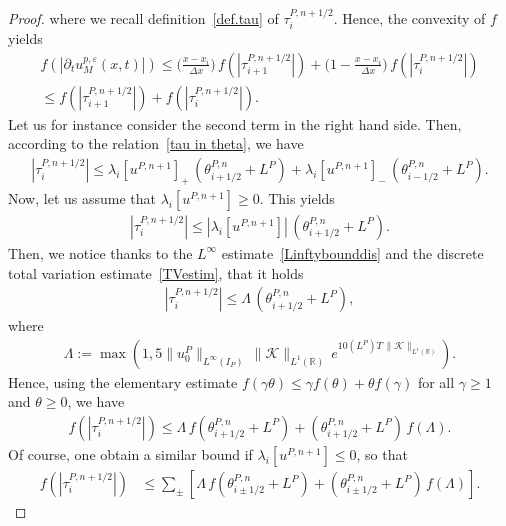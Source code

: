 \documentclass[10pt,a4paper]{amsart}
\newcommand{\K}{\mathcal{K}}
\newcommand{\R}{\mathbb{R}}
\newcommand{\eps}{\varepsilon}
\begin{document}
\begin{proof}
where we recall definition~\eqref{def.tau} of $\tau^{P,n+1/2}_i$. Hence, the convexity of $f$ yields
\begin{multline*}
    f\left(\left|\partial_t u^{p, \eps}_M(x,t)\right|\right) \leq \bigg(\frac{x - x_i}{\Delta x}\bigg)\,f\left(\left|\tau_{i + 1}^{P, n + 1/2}\right|\right) + \bigg( 1 - \frac{x - x_i}{\Delta x}\bigg) \, f\left(\left|\tau_{i } ^{P, n +1/2}\right|\right)\\
    \leq f\left(\left|\tau_{i + 1}^{P, n + 1/2}\right|\right) +  f\left(\left|\tau_{i } ^{P, n +1/2}\right|\right).
\end{multline*}
Let us for instance consider the second term in the right hand side. Then, according to the relation~\eqref{tau in theta}, we have
\begin{align*}
    \left|\tau_i^{P, n +1/2}\right| \leq \lambda_i[u^{P, n + 1}]_+ \, \left(\theta_{i +1/2}^{P,n} + L^P\right) + \lambda_i[u^{P,n + 1}]_- \, \left(\theta_{i-1/2}^{P, n} + L^P\right).
\end{align*}
Now, let us assume that $\lambda_i[u^{P,n+1}]\ge 0$. This yields
\begin{align*}
    \left|\tau_i^{P, n +1/2}\right| \leq |\lambda_i[u^{P, n + 1}]| \, \left(\theta_{i +1/2}^{P,n} + L^P\right).
\end{align*}
Then, we notice thanks to the $L^\infty$ estimate~\eqref{Linftybounddis} and the discrete total variation estimate~\eqref{TVestim}, that it holds
\begin{align*}
    \left|\tau_i^{P, n +1/2}\right| \leq \Lambda\, \left(\theta_{i +1/2}^{P,n} + L^P\right),
\end{align*}
where
\begin{align*}
    \Lambda := \max\left(1,5\|u^P_0\|_{L^\infty(I_P)} \, \|\K\|_{L^1(\R)} \, e^{10 (L^P)T \, \|\K\|_{L^1(\R)}}\right).
\end{align*}
Hence, using the elementary estimate $f(\gamma \theta) \leq \gamma f(\theta)+\theta f(\gamma)$ for all $\gamma\geq 1$ and $\theta \geq 0$, we have
\begin{align*}
    f\left(\left|\tau_i^{P, n +1/2}\right|\right) \leq \Lambda\, f\left(\theta_{i +1/2}^{P,n} + L^P\right) + \left(\theta_{i +1/2}^{P,n} + L^P\right)  \, f\left(\Lambda\right).
\end{align*}
Of course, one obtain a similar bound if $\lambda_i[u^{P,n+1}]\le 0$, so that
\begin{align}\label{bound.ftau}
    f\left(\left|\tau_i^{P, n +1/2}\right|\right) &\leq \sum_{\pm} \left[\Lambda\, f\left(\theta_{i \pm 1/2}^{P,n} + L^P\right) + \left(\theta_{i \pm 1/2}^{P,n} + L^P\right)  \, f\left(\Lambda\right) \right].

\end{align}
\end{proof}
\end{document}
